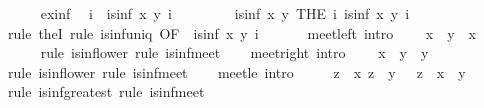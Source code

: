 \begin{isabellebody}
\ \ \ \ \isamarkupfalse%
\ ex{\isacharunderscore}inf\ \isamarkupfalse%
\ i\ \ {\isachardoublequoteopen}is{\isacharunderscore}inf\ x\ y\ i{\isachardoublequoteclose}\ \isacommand{{\isachardot}{\isachardot}}\isamarkupfalse%
\isanewline
\ \ \ \ \isamarkupfalse%
\ \isamarkupfalse%
\ {\isachardoublequoteopen}is{\isacharunderscore}inf\ x\ y\ {\isacharparenleft}THE\ i{\isachardot}\ is{\isacharunderscore}inf\ x\ y\ i{\isacharparenright}{\isachardoublequoteclose}\isanewline
\ \ \ \ \ \ \isamarkupfalse%
\ {\isacharparenleft}rule\ theI{\isacharparenright}\ {\isacharparenleft}rule\ is{\isacharunderscore}inf{\isacharunderscore}uniq\ {\isacharbrackleft}OF\ {\isacharunderscore}\ {\isacharbackquoteopen}is{\isacharunderscore}inf\ x\ y\ i{\isacharbackquoteclose}{\isacharbrackright}{\isacharparenright}\isanewline
\ \ \isamarkupfalse%
\isanewline
\isanewline
\ \ \isamarkupfalse%
\ meet{\isacharunderscore}left\ {\isacharbrackleft}intro{\isacharquery}{\isacharbrackright}{\isacharcolon}\isanewline
\ \ \ \ {\isachardoublequoteopen}x\ {\isasymsqinter}\ y\ {\isasymsqsubseteq}\ x{\isachardoublequoteclose}\isanewline
\ \ \ \ \isamarkupfalse%
\ {\isacharparenleft}rule\ is{\isacharunderscore}inf{\isacharunderscore}lower{\isacharparenright}\ {\isacharparenleft}rule\ is{\isacharunderscore}inf{\isacharunderscore}meet{\isacharparenright}\isanewline
\isanewline
\ \ \isamarkupfalse%
\ meet{\isacharunderscore}right\ {\isacharbrackleft}intro{\isacharquery}{\isacharbrackright}{\isacharcolon}\isanewline
\ \ \ \ {\isachardoublequoteopen}x\ {\isasymsqinter}\ y\ {\isasymsqsubseteq}\ y{\isachardoublequoteclose}\isanewline
\ \ \ \ \isamarkupfalse%
\ {\isacharparenleft}rule\ is{\isacharunderscore}inf{\isacharunderscore}lower{\isacharparenright}\ {\isacharparenleft}rule\ is{\isacharunderscore}inf{\isacharunderscore}meet{\isacharparenright}\isanewline
\isanewline
\ \ \isamarkupfalse%
\ meet{\isacharunderscore}le\ {\isacharbrackleft}intro{\isacharquery}{\isacharbrackright}{\isacharcolon}\isanewline
\ \ \ \ {\isachardoublequoteopen}{\isasymlbrakk}\ z\ {\isasymsqsubseteq}\ x{\isacharsemicolon}\ z\ {\isasymsqsubseteq}\ y\ {\isasymrbrakk}\ {\isasymLongrightarrow}\ z\ {\isasymsqsubseteq}\ x\ {\isasymsqinter}\ y{\isachardoublequoteclose}\isanewline
\ \ \ \ \isamarkupfalse%
\ {\isacharparenleft}rule\ is{\isacharunderscore}inf{\isacharunderscore}greatest{\isacharparenright}\ {\isacharparenleft}rule\ is{\isacharunderscore}inf{\isacharunderscore}meet{\isacharparenright}\isanewline

\end{isabellebody}

